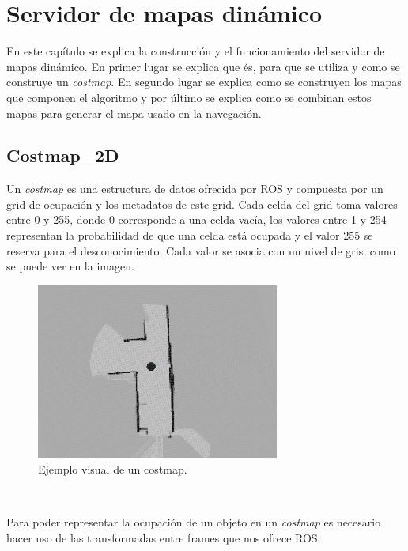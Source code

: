 \chapter{Servidor de mapas dinámico}
\label{cap:sevidordemapasdinamico}


En este capítulo se explica la construcción y el funcionamiento del servidor de mapas dinámico. En primer lugar se explica que és, para que se utiliza y como se construye un \textit{costmap}. En segundo lugar se explica como se construyen los mapas que componen el algoritmo y por último se explica como se combinan estos mapas para generar el mapa usado en la navegación.

\section{Costmap\_2D}
\label{sec:costmap2d}
Un \textit{costmap} es una estructura de datos ofrecida por ROS y compuesta por un grid de ocupación y los metadatos de este grid. Cada celda del grid toma valores entre 0 y 255, donde 0 corresponde a una celda vacía, los valores entre 1 y 254 representan la probabilidad de que una celda está ocupada y el valor 255 se reserva para el desconocimiento. Cada valor se asocia con un nivel de gris, como se puede ver en la imagen.
\begin{figure} [hbtp]
  \begin{center}
    \includegraphics[width=8cm]{img/cap4/costmap-ejemplo}
  \end{center}
  \caption{Ejemplo visual de un costmap.}
  \label{fig:costmap-ejemplo}
\end{figure}\

Para poder representar la ocupación de un objeto en un \textit{costmap} es necesario hacer uso de las transformadas entre frames que nos ofrece ROS.

